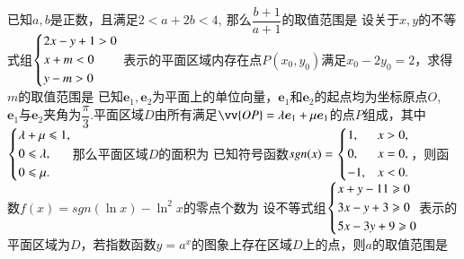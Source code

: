 \documentclass{BHCexam}
\begin{document}
\begin{questions}
\begin{center}
\end{center}
\qs 已知$ a,b $是正数，且满足$ 2<a+2b<4, ~$那么$ \dfrac{b+1}{a+1} $的取值范围是\xx
{}
\qs 设关于$ x,y $的不等式组$ \begin{dcases}
2x-y+1>0\\x+m<0\\y-m>0
\end{dcases} $
表示的平面区域内存在点$ P(x_0,y_0) $满足$ x_0-2y_0=2 $，求得$ m $的取值范围是\xx
{}
\qs 已知$ \bm{e}_1 ,\bm{e}_2$为平面上的单位向量，$ \bm{e}_1 $和$ \bm{e}_2 $的起点均为坐标原点$ O $,~  $\bm{e}_1$与$\bm{e}_2$夹角为$ \dfrac{\pi}{3} .$平面区域$ D $由所有满足$ \vv{OP}=\lambda \bm{e}_1+\mu \bm{e}_1 $的点$ P $组成，其中$ \begin{dcases}
\lambda+\mu\le1,\\
0\le\lambda,\\
0\le\mu.
\end{dcases} $那么平面区域$ D $的面积为\xx
{}
\qs 已知符号函数$ sgn(x)=\begin{dcases}
1,&x>0,\\
0,&x=0,\\
-1,&x<0.
\end{dcases} $，则函数$f(x)=sgn(\ln x)-\ln^2x$的零点个数为\xx
{}
\qs 设不等式组$ \begin{dcases}
x+y-11\ge 0\\3x-y+3\ge 0\\5x-3y+9\ge 0
\end{dcases} $表示的平面区域为$ D $，若指数函数$ y=a^x $的图象上存在区域$ D $上的点，则$ a $的取值范围是\xx
\onech{$\left(1,3\right]$}{$\left[2,3\right]$}{$\left(1,2\right]$}{$\left[3,+\infty\right)$}

\end{questions}
\end{document}
